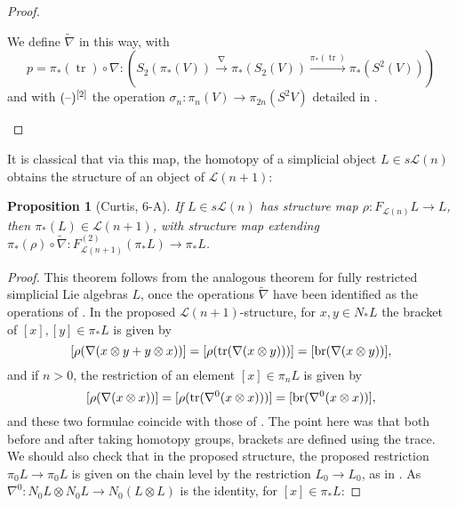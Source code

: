 \documentclass[11pt]{amsart}
\theoremstyle{plain}
\newtheorem{prop}[thm]{Proposition}
\theoremstyle{definition}
\DeclareMathOperator{\trace}{tr}
\newcommand{\DASH}{\textup{--}}
\renewcommand{\to}{\longrightarrow}
\newcommand{\calL}{\mathcal{L}}
\theoremstyle{plain}
\newcommand{\restn}[1]{#1^{[2]}}
\newcommand{\F}{\mathbb{F}}
\begin{document}
\begin{homotopy operations for PRLs}
\begin{proof}
\begin{shaded}
We define $\widetilde{\nabla}$ in this way, with
\[p=\pi_*(\trace)\circ\nabla:\left(S_2(\pi_*(V))\overset{\nabla}{\to}\pi_*(S_2(V))\overset{\pi_*(\trace)}{\to}\pi_*(S^2(V))\right)\]
and with $\restn{(\DASH)}$ the operation $\sigma_n:\pi_n(V)\to \pi_{2n}(S^2V)$ detailed in \cite[\S3]{MR1089001}.
\end{shaded}
%
\end{proof}
It is classical that via this map, the homotopy of a simplicial object $L\in s\calL(n)$ obtains the structure of an object of $\calL(n+1)$:
\begin{prop}[Curtis, 6-A]\label{prop on top operations}
If $L\in s\calL(n)$ has structure map $\rho:F_{\calL(n)}L\to L$, then $\pi_*(L)\in\calL(n+1)$, with structure map extending $\pi_*(\rho)\circ\widetilde{\nabla}:F^{(2)}_{\calL(n+1)}(\pi_*L)\to \pi_*L$.
\end{prop}
\begin{proof}
This theorem follows from the analogous theorem for fully restricted simplicial Lie algebras $L$, once the operations $\widetilde{\nabla}$ have been identified as the operations of \cite[\S8.5]{CurtisSimplicialHtpy.pdf}. In the proposed $\calL(n+1)$-structure, for $x,y
\in N_*L$ the bracket of $[x],[y]\in\pi_*L$ is given by
\[[\rho(\nabla(x\otimes y+y\otimes x))]=[\rho(\trace(\nabla(x\otimes y)))]=[\textup{br}(\nabla(x\otimes y))],\]
and if $n>0$, the restriction of an element $[x]\in\pi_nL$ is given by
\[[\rho(\nabla(x\otimes x))]=[\rho(\trace(\nabla^0(x\otimes x)))]=[\textup{br}(\nabla^0(x\otimes x))],\]
and these two formulae coincide with those of \cite{CurtisSimplicialHtpy.pdf}. The point here was that both before and after taking homotopy groups, brackets are defined using the trace. We should also check that in the proposed structure, the proposed restriction $\pi_0L\to \pi_0L$ is given on the chain level by the restriction $L_0\to L_0$, as in \cite{CurtisSimplicialHtpy.pdf}. As $\nabla^0:N_0L\otimes N_0L\to N_0(L\otimes L)$ is the identity, for $[x]\in\pi_*L$:

\end{proof}
\end{homotopy operations for PRLs}
\end{document}
